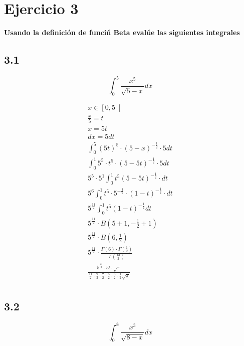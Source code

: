 \section*{Ejercicio 3}
\noindent\textbf{Usando la definición de funciń Beta evalúe las siguientes integrales}

\subsection*{3.1}
\[
  \int_{0}^{5} \frac{x^5}{\sqrt{5-x}} dx
\]

\begin{gather*}
  x \in \left[0, 5\right[ \\
  \frac{x}{5} = t \\
  x = 5t \\
  dx = 5 dt \\
  \int_{0}^{5} (5t)^5 \cdot (5 - x)^{-\frac{1}{2}} \cdot 5 dt \\
  \int_{0}^{1} 5^5 \cdot t^5 \cdot (5 - 5t)^{-\frac{1}{2}} \cdot 5 dt \\
  5^5 \cdot 5^1 \int_{0}^{1} t^5 (5 - 5t)^{-\frac{1}{2}} \cdot dt \\
  5^6 \int_{0}^{1} t^5 \cdot 5^{-\frac{1}{2}} \cdot (1 - t)^{-\frac{1}{2}} \cdot dt \\
  5^{\frac{11}{2}} \int_{0}^{1} t^5 (1 - t)^{-\frac{1}{2}} dt \\
  5^{\frac{11}{2}} \cdot B(5 + 1, -\frac{1}{2} + 1) \\
  5^{\frac{11}{2}} \cdot B(6, \frac{1}{2}) \\
  5^{\frac{11}{2}} \cdot \frac{\Gamma(6) \cdot \Gamma(\frac{1}{2})}{\Gamma(\frac{13}{2})} \\
  \frac{5^{\frac{11}{2}} \cdot 5! \cdot \sqrt{\pi}}{\frac{11}{2} \cdot \frac{9}{2} \cdot \frac{7}{2} \cdot \frac{5}{2} \cdot \frac{3}{2} \cdot \frac{1}{2} \sqrt{\pi}} \\
\end{gather*}



\subsection*{3.2}
\[
  \int_{0}^{8} \frac{x^3}{\sqrt{8-x}} dx
\]

